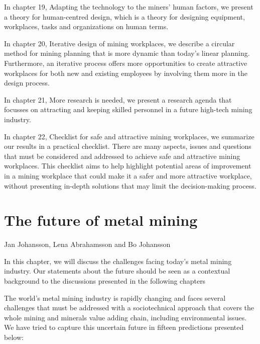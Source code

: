 \documentclass[
  12pt,
]{scrbook}
\newenvironment{chap-auth}
{\vspace{1cm}\begin{center}\begin{flushright}\sffamily\noindent}
  {\end{flushright}\end{center}\vspace{1cm}}
\begin{document}
In chapter 19, Adapting the technology to the miners' human factors, we present a theory for human-centred design, which is a theory for designing equipment, workplaces, tasks and organizations on human terms.

In chapter 20, Iterative design of mining workplaces, we describe a circular method for mining planning that is more dynamic than today's linear planning. Furthermore, an iterative process offers more opportunities to create attractive workplaces for both new and existing employees by involving them more in the design process.

In chapter 21, More research is needed, we present a research agenda that focusses on attracting and keeping skilled personnel in a future high-tech mining industry.

In chapter 22, Checklist for safe and attractive mining workplaces, we summarize our results in a practical checklist. There are many aspects, issues and questions that must be considered and addressed to achieve safe and attractive mining workplaces. This checklist aims to help highlight potential areas of improvement in a mining workplace that could make it a safer and more attractive workplace, without presenting in-depth solutions that may limit the decision-making process.

\clearpage
\pagestyle{headings}

\hypertarget{the-future-of-metal-mining}{%
\chapter{The future of metal mining}\label{the-future-of-metal-mining}}

\begin{chap-auth}
Jan Johansson, Lena Abrahamsson and Bo Johansson
\end{chap-auth}

In this chapter, we will discuss the challenges facing today's metal mining industry. Our statements about the future should be seen as a contextual background to the discussions presented in the following chapters

The world's metal mining industry is rapidly changing and faces several challenges that must be addressed with a sociotechnical approach that covers the whole mining and minerals value adding chain, including environmental issues. We have tried to capture this uncertain future in fifteen predictions presented below:
\end{document}
